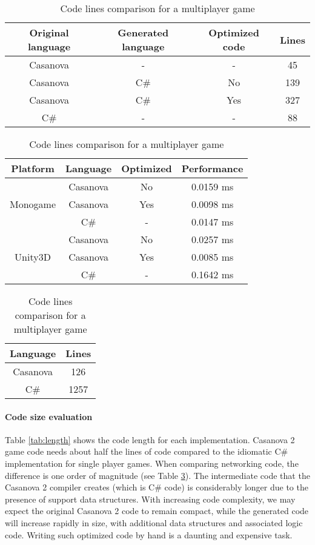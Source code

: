 \begin{table}[!ht]
\caption{Code lines comparison for a singleplayer game}
\tiny
\label{tab:length}
\centering
\begin{tabular}{ @{}|c|c|c|c|@{} }
\hline
  Original language & Generated language & Optimized code & Lines \\ \hline
  Casanova & - & - & 45 \\
  Casanova & C\# & No & 139 \\
  Casanova & C\# & Yes & 327 \\
  C\# & - & - & 88 \\ \hline
\hline
\end{tabular}
\vspace{5pt}
\caption{Running time comparison for a singleplayer game}
\tiny
\label{tab:times}
\centering
\begin{tabular}{ @{}|c|c|c|c|@{} }
\hline
 Platform & Language & Optimized & Performance\\ \hline
\multirow{3}{*}{Monogame}
  & Casanova & No & 0.0159 ms\\
  & Casanova & Yes & 0.0098 ms\\
  & C\# &   - & 0.0147 ms\\ \hline
\multirow{3}{*}{Unity3D}
  & Casanova & No & 0.0257 ms\\
  & Casanova & Yes & 0.0085 ms\\
  & C\# &   - & 0.1642 ms\\ \hline
\hline
\end{tabular}
\vspace{5pt}
\caption{Code lines comparison for a multiplayer game}
\normalsize
\centering
\label{tab:networking}
\centering
\begin{tabular}{ @{}|c|c|@{} }
	\hline
	Language & Lines \\ \hline
	Casanova & 126 \\
	\hline
	C\# &  1257 \\
	\hline
\end{tabular}
\end{table}

\paragraph*{Code size evaluation}
Table \ref{tab:length} shows the code length for each implementation. Casanova 2 game code needs about half the lines of code compared to the idiomatic C\# implementation for single player games. When comparing networking code, the difference is one order of magnitude (see Table \ref{tab:networking}). The intermediate code that the Casanova 2 compiler creates (which is C\# code) is considerably longer due to the presence of support data structures. With increasing code complexity, we may expect the original Casanova 2 code to remain compact, while the generated code will increase rapidly in size, with additional data structures and associated logic code. Writing such optimized code by hand is a daunting and expensive task.